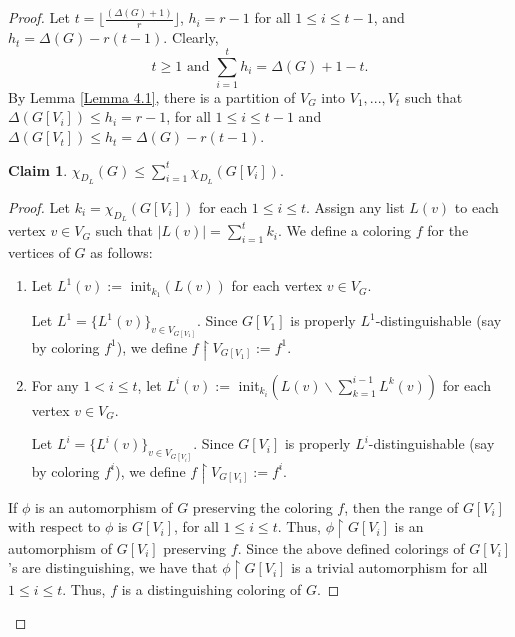 \documentclass[12pt,reqno,a4paper]{amsart}
\theoremstyle{definition}
\newtheorem{claim}[defn]{Claim}
\begin{document}
\begin{proof}
Let $t=\lfloor\frac{(\Delta(G)+1)}{r}\rfloor$, $h_{i}=r-1$ for all $1\leq i\leq t-1$, and $h_{t}=\Delta(G)-r(t-1)$. Clearly,
\[t\geq 1 \text{ and } \sum_{i=1}^{t} h_{i}=\Delta(G)+1-t.\] 
By Lemma \ref{Lemma 4.1}, there is a partition of $V_{G}$ into $V_{1},...,V_{t}$ such that $\Delta(G[V_{i}])\leq h_{i}=r-1$, for all $1\leq i\leq t-1$ and $\Delta(G[V_{t}])\leq h_{t}=\Delta(G)-r(t-1)$.

\begin{claim}\label{claim 4.4}
   $\chi_{D_{L}}(G)\leq \sum_{i=1}^{t} \chi_{D_{L}}(G[V_{i}])$. 
\end{claim}

\begin{proof}
Let $k_{i}=\chi_{D_{L}}(G[V_{i}])$ for each $1\leq i\leq t$. Assign any list $L(v)$ to each vertex $v \in V_{G}$ such that $\vert L(v)\vert= \sum_{i=1}^{t}k_{i}$. We define a coloring $f$ for the vertices of $G$ as follows:

\begin{enumerate}
    \item Let $L^{1}(v):=$ init$_{k_{1}}(L(v))$ for each vertex $v\in V_{G}$. 
    \vspace{2mm}
    
    Let $L^{1}=\{L^{1}(v)\}_{v\in V_{G[V_{1}]}}$. Since $G[V_{1}]$ is properly $L^{1}$-distinguishable (say by coloring $f^1$), we define $f\restriction V_{G[V_{1}]}:=f^{1}$.
    \vspace{2mm}
    
    \item For any $1<i\leq t$, let $L^{i}(v):=$ init$_{k_{i}}(L(v)\backslash \sum_{k= 1}^{i-1} L^{k}(v)) $ for each vertex $v\in V_{G}$. 
    \vspace{2mm}
    
    Let $L^{i}=\{L^{i}(v)\}_{v\in V_{G[V_{i}]}}$. Since $G[V_{i}]$ is properly $L^{i}$-distinguishable (say by coloring $f^i$), we define $f\restriction V_{G[V_{i}]}:=f^{i}$.
\end{enumerate}  

If $\phi$ is an automorphism of $G$ preserving the coloring $f$, then the range of $G[V_{i}]$ with respect to $\phi$ is $G[V_{i}]$, for all $1\leq i\leq t$. Thus, $\phi\restriction G[V_{i}]$ is an automorphism of $G[V_{i}]$ preserving $f$. Since the above defined colorings of $G[V_{i}]$'s are distinguishing, we have that $\phi\restriction G[V_{i}]$ is a trivial automorphism for all $1\leq i\leq t$. Thus, $f$ is a distinguishing coloring of $G$. 


\end{proof}
\end{proof}
\end{document}

